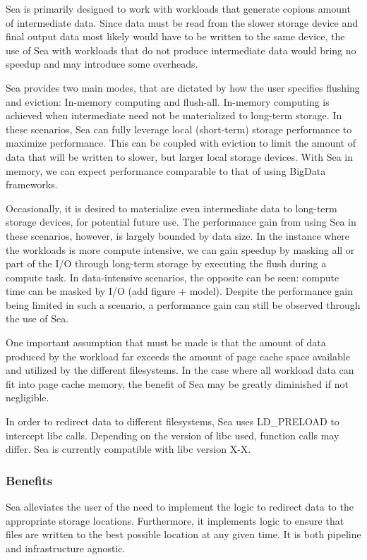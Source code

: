 \documentclass[10pt,journal,compsoc]{IEEEtran}
\begin{document}
Sea is primarily designed to work with workloads that generate copious amount of intermediate data.
Since data must be read from the slower storage device and final output data most likely would have to
be written to the same device, the use of Sea with workloads that do not produce intermediate data would
bring no speedup and may introduce some overheads. 

Sea provides two main modes, that are dictated by how the user specifies flushing and eviction: In-memory computing and flush-all.
In-memory computing is achieved when intermediate need not be materialized to long-term storage. In these scenarios, Sea can fully
leverage local (short-term) storage performance to maximize performance. This can be coupled with eviction to limit the amount of
data that will be written to slower, but larger local storage devices. With Sea in memory, we can expect performance comparable to
that of using BigData frameworks.

Occasionally, it is desired to materialize even intermediate data to long-term storage devices, for potential future use. The
performance gain from using Sea in these scenarios, however, is largely bounded by data size. In the instance where the workloads is more compute intensive,
we can gain speedup by masking all or part of the I/O through long-term storage by executing the flush during a compute task. In data-intensive scenarios, the 
opposite can be seen: compute time can be masked by I/O (add figure + model). Despite the performance gain being limited in
such a scenario, a performance gain can still be observed through the use of Sea.

One important assumption that must be made is that the amount of data produced by the workload far exceeds the amount of page cache space available and utilized
by the different filesystems. In the case where all workload data can fit into page cache memory, the benefit of Sea may be
greatly diminished if not negligible.

In order to redirect data to different filesystems, Sea uses LD\_PRELOAD to intercept libc calls. Depending on the
version of libc used, function calls may differ. Sea is currently compatible with libc version X-X.


\subsubsection{Benefits}
Sea alleviates the user of the need to implement the logic to redirect data to the appropriate
storage locations. Furthermore, it implements logic to ensure that files are written to the best possible
location at any given time. It is both pipeline and infrastructure agnostic. 
\end{document}

